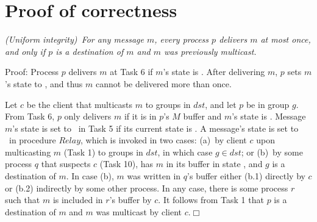 
\newcommand{\Pend}{\ensuremath{\mathit{ToOrder}}\xspace}
\newcommand{\Done}{\ensuremath{\mathit{Ordered}}\xspace}
\newcommand{\Decided}{\ensuremath{\mathit{Decided}}\xspace}
\newcommand{\Buffer}{\ensuremath{\mathcal{B}}\xspace}

\clearpage
\section{Proof of correctness}

\begin{proposition}
\textit{(Uniform integrity)~For any message $m$, every process $p$ delivers $m$ at most once, and only if $p$ is a destination of $m$ and $m$ was previously multicast.}
\end{proposition}
\vspace{2mm}
\noindent
{\sc Proof:} 
Process $p$ delivers $m$ at Task 6 if $m$'s state is \ordered. 
After delivering $m$, $p$ sets $m$'s state to \done, and thus $m$ cannot be delivered more than once.

Let $c$ be the client that multicasts $m$ to groups in $dst$, and let $p$ be in group $g$. 
From Task 6, $p$ only delivers $m$ if it is in $p$'s $M$ buffer and $m$'s state is \ordered. 
Message $m$'s state is set to \ordered\ in Task 5 if its current state is \mcast.
A message's state is set to \mcast\ in procedure $Relay$, which is invoked in two cases:
(a)~by client $c$ upon multicasting $m$ (Task 1) to groups in $dst$, in which case $g \in dst$; or 
(b)~by some process $q$ that suspects $c$ (Task 10), has $m$ in its buffer in state \mcast, and $g$ is a destination of $m$.
In case (b), $m$ was written in $q$'s buffer either (b.1) directly by $c$ or (b.2) indirectly by some other process.
In any case, there is some process $r$ such that $m$ is included in $r$'s buffer by $c$.
It follows from Task 1 that $p$ is a destination of $m$ and $m$ was multicast by client $c$.\hfill$\Box$

